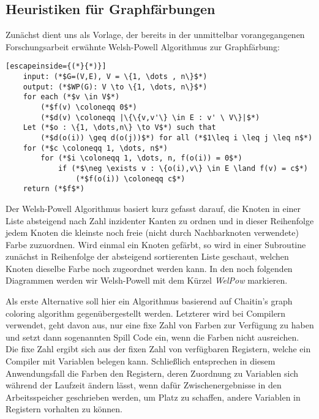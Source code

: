 \documentclass[a4paper]{article}
\theoremstyle{nonumberplain}
\begin{document}
\subsection{Heuristiken für Graphfärbungen}

Zunächst dient uns als Vorlage, der bereits in der unmittelbar vorangegangenen Forschungsarbeit \cite{dubslaff2019breaking} erwähnte Welsh-Powell Algorithmus zur Graphfärbung:
{
	\small
	\begin{lstlisting}[escapeinside={(*}{*)}]
	input: (*$G=(V,E), V = \{1, \dots , n\}$*)
	output: (*$WP(G): V \to \{1, \dots, n\}$*)
	for each (*$v \in V$*)
		(*$f(v) \coloneqq 0$*)
		(*$d(v) \coloneqq |\{\{v,v'\} \in E : v' \ V\}|$*)
	Let (*$o : \{1, \dots,n\} \to V$*) such that
		(*$d(o(i)) \geq d(o(j))$*) for all (*$1\leq i \leq j \leq n$*)
	for (*$c \coloneqq 1, \dots, n$*)
		for (*$i \coloneqq 1, \dots, n, f(o(i)) = 0$*)
			if (*$\neg \exists v : \{o(i),v\} \in E \land f(v) = c$*)
				(*$f(o(i)) \coloneqq c$*)
	return (*$f$*)
	\end{lstlisting}
}
Der Welsh-Powell Algorithmus basiert kurz gefasst darauf, die Knoten in einer Liste absteigend nach Zahl inzidenter Kanten zu ordnen und in dieser Reihenfolge jedem Knoten die kleinste noch freie (nicht durch Nachbarknoten verwendete) Farbe zuzuordnen. Wird einmal ein Knoten gefärbt, so wird in einer Subroutine zunächst in Reihenfolge der absteigend sortierenten Liste geschaut, welchen Knoten dieselbe Farbe noch zugeordnet werden kann. In den noch folgenden Diagrammen werden wir Welsh-Powell mit dem Kürzel \textit{WelPow} markieren.


Als erste Alternative soll hier ein Algorithmus basierend auf Chaitin’s graph coloring algorithm \cite{chaitin} gegenübergestellt werden. Letzterer wird bei Compilern verwendet, geht davon aus, nur eine fixe Zahl von Farben zur Verfügung zu haben und setzt dann sogenannten Spill Code ein, wenn die Farben nicht ausreichen. Die fixe Zahl ergibt sich aus der fixen Zahl von verfügbaren Registern, welche ein Compiler mit Variablen belegen kann. Schließlich entsprechen in diesem Anwendungsfall die Farben den Registern, deren Zuordnung zu Variablen sich während der Laufzeit ändern lässt, wenn dafür Zwischenergebnisse in den Arbeitsspeicher geschrieben werden, um Platz zu schaffen, andere Variablen in Registern vorhalten zu können.
\end{document}

